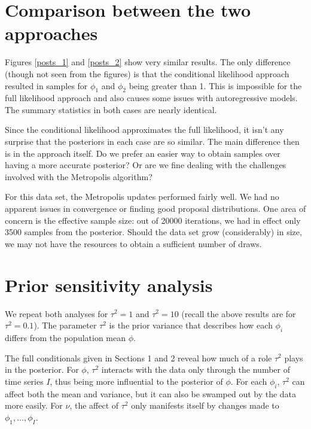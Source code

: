 \documentclass[12pt]{article}
\begin{document}
\section{Comparison between the two approaches}

\noindent Figures \ref{posts_1} and \ref{posts_2} show very similar results. The only difference (though not seen from the figures) is that the conditional likelihood approach resulted in samples for $\phi_1$ and $\phi_2$ being greater than 1. This is impossible for the full likelihood approach and also causes some issues with autoregressive models. The summary statistics in both cases are nearly identical.
\bigskip

\noindent Since the conditional likelihood approximates the full likelihood, it isn't any surprise that the posteriors in each case are so similar. The main difference then is in the approach itself. Do we prefer an easier way to obtain samples over having a more accurate posterior? Or are we fine dealing with the challenges involved with the Metropolis algorithm?
\bigskip

\noindent For this data set, the Metropolis updates performed fairly well. We had no apparent issues in convergence or finding good proposal distributions. One area of concern is the effective sample size: out of 20000 iterations, we had in effect only 3500 samples from the posterior. Should the data set grow (considerably) in size, we may not have the resources to obtain a sufficient number of draws.

\section{Prior sensitivity analysis}

\noindent We repeat both analyses for $\tau^2=1$ and $\tau^2=10$ (recall the above results are for $\tau^2=0.1$). The parameter $\tau^2$ is the prior variance that describes how each $\phi_i$ differs from the population mean $\phi$.
\bigskip

\noindent The full conditionals given in Sections 1 and 2 reveal how much of a role $\tau^2$ plays in the posterior. For $\phi$, $\tau^2$ interacts with the data only through the number of time series $I$, thus being more influential to the posterior of $\phi$. For each $\phi_i$, $\tau^2$ can affect both the mean and variance, but it can also be swamped out by the data more easily. For $\nu$, the affect of $\tau^2$ only manifests itself by changes made to $\phi_1,\ldots,\phi_I$.
\bigskip
\end{document}
